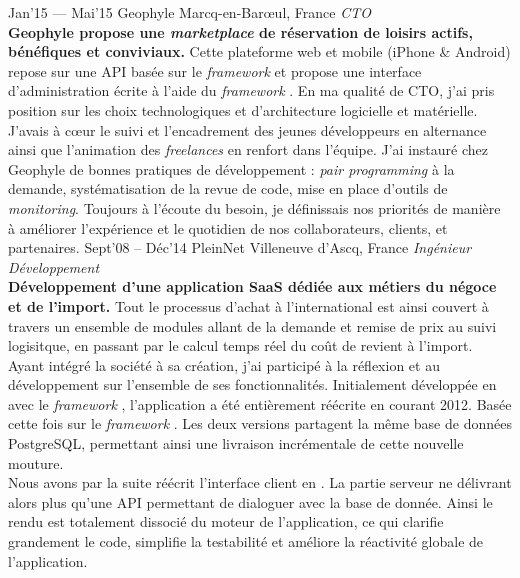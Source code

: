 \documentclass[]{cv} %
\begin{document}
\begin{entrylist}
\entry
{Jan'15 — Mai'15}
{Geophyle}
{Marcq-en-Barœul, France}
{\emph{CTO}
\vspace{5pt}\\
\textbf{Geophyle propose une \emph{marketplace} de réservation de loisirs actifs, bénéfiques et conviviaux.}
Cette plateforme web et mobile (iPhone \& Android) repose sur une API  basée sur le \emph{framework}  et propose une interface d'administration écrite à l'aide du \emph{framework} .
\vspace{5pt}
En ma qualité de CTO, j'ai pris position sur les choix technologiques et d'architecture logicielle et matérielle. J'avais à cœur le suivi et l'encadrement des jeunes développeurs en alternance ainsi que l'animation des \emph{freelances} en renfort dans l'équipe. J'ai instauré chez Geophyle de bonnes pratiques de développement : \emph{pair programming} à la demande, systématisation de la revue de code, mise en place d'outils de \emph{monitoring}. Toujours à l'écoute du besoin, je définissais nos priorités de manière à améliorer l'expérience et le quotidien de nos collaborateurs, clients, et partenaires.
}
\entry
{Sept'08 – Déc'14}
{PleinNet}
{Villeneuve d'Ascq, France}
{\emph{Ingénieur Développement}
\vspace{5pt}\\
\textbf{Développement d'une application SaaS dédiée aux métiers du négoce et de l'import.} Tout le processus d'achat à l'international est ainsi couvert à travers un ensemble de modules allant de la demande et remise de prix au suivi logisitque, en passant par le calcul temps réel du coût de revient à l'import.
\vspace{5pt}
Ayant intégré la société à sa création, j'ai participé à la réflexion et au développement sur l'ensemble de ses fonctionnalités. Initialement développée en  avec le \emph{framework} , l'application a été entièrement réécrite en  courant 2012. Basée cette fois sur le \emph{framework} . Les deux versions partagent la même base de données PostgreSQL, permettant ainsi une livraison incrémentale de cette nouvelle mouture.
\vspace{5pt}\\
Nous avons par la suite réécrit l'interface client en . La partie serveur ne délivrant alors plus qu'une API permettant de dialoguer avec la base de donnée. Ainsi le rendu est totalement dissocié du moteur de l'application, ce qui clarifie grandement le code, simplifie la testabilité et améliore la réactivité globale de l'application.
}
\end{entrylist}
\end{document}
